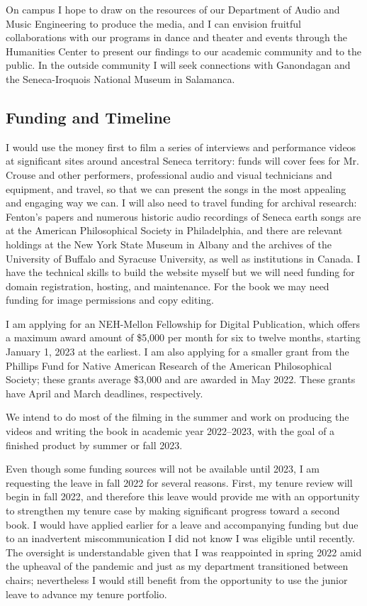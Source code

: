 \documentclass[12pt]{article}
\begin{document}
On campus I hope to draw on the resources of our Department of Audio and Music
Engineering to produce the media, and I can envision fruitful collaborations
with our programs in dance and theater and events through the Humanities
Center to present our findings to our academic community and to the public.
In the outside community I will seek connections with Ganondagan and the
Seneca-Iroquois National Museum in Salamanca.

\subsection{Funding and Timeline}

I would use the money first to film a series of interviews and performance
videos at significant sites around ancestral Seneca territory: funds will
cover fees for Mr. Crouse and other performers, professional audio and visual
technicians and equipment, and travel, so that we can present the songs in the
most appealing and engaging way we can.
I will also need to travel funding for archival research: Fenton's papers
and numerous historic audio recordings of Seneca earth songs are at the
American Philosophical Society in Philadelphia, and there are relevant
holdings at the New York State Museum in Albany and the archives of the
University of Buffalo and Syracuse University, as well as institutions in
Canada.
I have the technical skills to build the website myself but we will need
funding for domain registration, hosting, and maintenance.
For the book we may need funding for image permissions and copy editing.

I am applying for an NEH-Mellon Fellowship for Digital Publication, which
offers a maximum award amount of \$5,000 per month for six to twelve months,
starting January 1, 2023 at the earliest.
I am also applying for a smaller grant from the Phillips Fund for Native
American Research of the American Philosophical Society; these grants average
\$3,000 and are awarded in May 2022.
These grants have April and March deadlines, respectively.

We intend to do most of the filming in the summer and work on producing the
videos and writing the book in academic year 2022--2023, with the goal of a
finished product by summer or fall 2023.

Even though some funding sources will not be available until 2023, I am
requesting the leave in fall 2022 for several reasons.
First, my tenure review will begin in fall 2022, and therefore this leave
would provide me with an opportunity to strengthen my tenure case by making
significant progress toward a second book. 
I would have applied earlier for a leave and accompanying funding but due to
an inadvertent miscommunication I did not know I was eligible until recently.
The oversight is understandable given that I was reappointed in spring 2022
amid the upheaval of the pandemic and just as my department transitioned
between chairs; nevertheless I would still benefit from the opportunity to
use the junior leave to advance my tenure portfolio.
\end{document}
